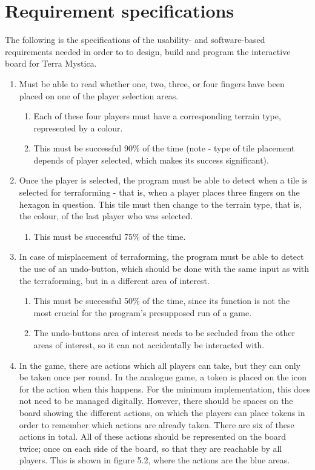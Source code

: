 \section{Requirement specifications} 
The following is the specifications of the usability- and software-based requirements needed in order to to design, build and program the interactive board for Terra Mystica.

\begin{enumerate}
\item Must be able to read whether one, two, three, or four fingers have been placed on one of the player selection areas.
	\begin{enumerate}
	\item Each of these four players must have a corresponding terrain type, represented by a colour.
	\item This must be successful 90\% of the time (note - type of tile placement depends of player selected, which makes its success significant).
	\end{enumerate}
\item Once the player is selected, the program must be able to detect when a tile is selected for terraforming - that is, when a player places three fingers on the hexagon in question. This tile must then change to the terrain type, that is, the colour, of the last player who was selected.
	\begin{enumerate}
	\item This must be successful 75\% of the time.
	\end{enumerate}
\item In case of misplacement of terraforming, the program must be able to detect the use of an undo-button, which should be done with the same input as with the terraforming, but in a different area of interest.
	\begin{enumerate}
	\item This must be successful 50\% of the time, since its function is not the most crucial for the program’s presupposed run of a game.
	\item The undo-buttons area of interest needs to be secluded from the other areas of interest, so it can not accidentally be interacted with. 
	\end{enumerate}
\item In the game, there are actions which all players can take, but they can only be taken once per round. In the analogue game, a token is placed on the icon for the action when this happens. For the minimum implementation, this does not need to be managed digitally. However, there should be spaces on the board showing the different actions, on which the players can place tokens in order to remember which actions are already taken. There are six of these actions in total. All of these actions should be represented on the board twice; once on each side of the board, so that they are reachable by all players. This is shown in figure 5.2, where the actions are the blue areas. 

\end{enumerate}
